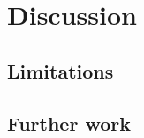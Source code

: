 \documentclass[../main.tex]{subfiles}
\begin{document}
    
    \chapter{Discussion}
    \lipsum[1-6]
    
    \section{Limitations}
    \lipsum[1]
    
    \section{Further work}
    \lipsum[1]
    
\biblio
\cleardoublepage
\end{document}
